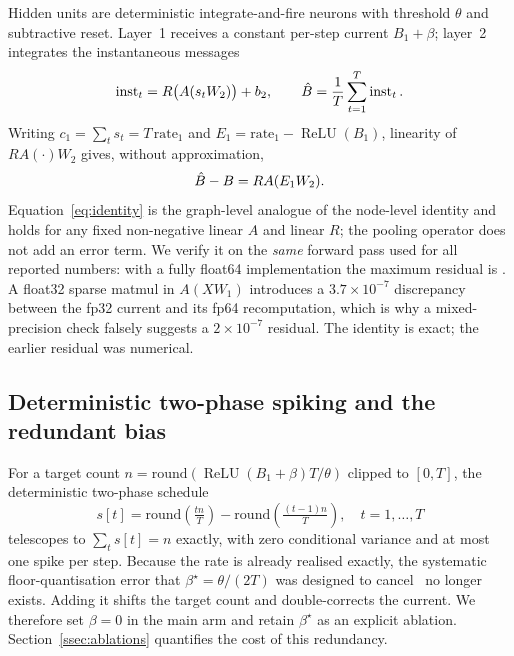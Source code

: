 Hidden units are deterministic integrate-and-fire neurons with threshold $\theta$ and subtractive reset. Layer~1 receives a constant per-step current $B_1+\beta$; layer~2 integrates the instantaneous messages
\begin{equation}
\operatorname{inst}_t = R\big(A (s_t W_2)\big) + b_2,\qquad
\hat{B} = \frac{1}{T}\sum_{t=1}^{T} \operatorname{inst}_t .
\label{eq:convert}
\end{equation}
Writing $c_1=\sum_t s_t = T\,\mathrm{rate}_1$ and $E_1=\mathrm{rate}_1-\operatorname{ReLU}(B_1)$, linearity of $R A (\cdot) W_2$ gives, without approximation,
\begin{equation}
\hat{B} - B = R A (E_1 W_2).
\label{eq:identity}
\end{equation}
Equation~\eqref{eq:identity} is the graph-level analogue of the node-level identity and holds for any fixed non-negative linear $A$ and linear $R$; the pooling operator does not add an error term. We verify it on the \emph{same} forward pass used for all reported numbers: with a fully float64 implementation the maximum residual is \IdentityMax. A float32 sparse matmul in $A(XW_1)$ introduces a $3.7\times10^{-7}$ discrepancy between the fp32 current and its fp64 recomputation, which is why a mixed-precision check falsely suggests a $2\times10^{-7}$ residual. The identity is exact; the earlier residual was numerical.

\subsection{Deterministic two-phase spiking and the redundant bias}
\label{ssec:twophase}

For a target count $n=\mathrm{round}(\operatorname{ReLU}(B_1+\beta)T/\theta)$ clipped to $[0,T]$, the deterministic two-phase schedule
\begin{equation}
s[t] = \mathrm{round}\!\left(\tfrac{t n}{T}\right) - \mathrm{round}\!\left(\tfrac{(t-1)n}{T}\right),\quad t=1,\dots,T
\label{eq:dtp}
\end{equation}
telescopes to $\sum_t s[t]=n$ exactly, with zero conditional variance and at most one spike per step. Because the rate is already realised exactly, the systematic floor-quantisation error that $\beta^\star=\theta/(2T)$ was designed to cancel~\cite{deng2021,wu2024ftbc} no longer exists. Adding it shifts the target count and double-corrects the current. We therefore set $\beta=0$ in the main arm and retain $\beta^\star$ as an explicit ablation. Section~\ref{ssec:ablations} quantifies the cost of this redundancy.

